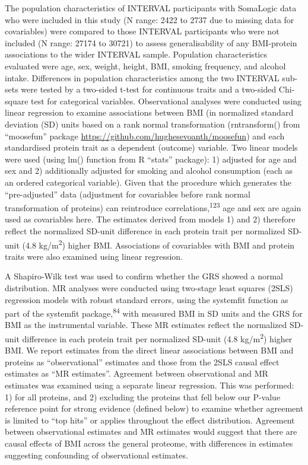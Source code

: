 \documentclass[11pt,twoside]{bristolthesis}
\begin{document}
The population characteristics of INTERVAL participants with SomaLogic data who were included in this study (N range: 2422 to 2737 due to missing data for covariables) were compared to those INTERVAL participants who were not included (N range: 27174 to 30721) to assess generalisability of any BMI-protein associations to the wider INTERVAL sample. Population characteristics evaluated were age, sex, weight, height, BMI, smoking frequency, and alcohol intake. Differences in population characteristics among the two INTERVAL sub-sets were tested by a two-sided t-test for continuous traits and a two-sided Chi-square test for categorical variables. Observational analyses were conducted using linear regression to examine associations between BMI (in normalized standard deviation (SD) units based on a rank normal transformation (rntransform() from ``moosefun'' package \url{https://github.com/hughesevoanth/moosefun}) and each standardised protein trait as a dependent (outcome) variable. Two linear models were used (using lm() function from R ``stats'' package): 1) adjusted for age and sex and 2) additionally adjusted for smoking and alcohol consumption (each as an ordered categorical variable). Given that the procedure which generates the ``pre-adjusted'' data (adjustment for covariables before rank normal transformation of proteins) can reintroduce correlations,\textsuperscript{123} age and sex are again used as covariables here. The estimates derived from models 1) and 2) therefore reflect the normalized SD-unit difference in each protein trait per normalized SD-unit (4.8 kg/m\textsuperscript{2}) higher BMI. Associations of covariables with BMI and protein traits were also examined using linear regression.

A Shapiro-Wilk test was used to confirm whether the GRS showed a normal distribution. MR analyses were conducted using two-stage least squares (2SLS) regression models with robust standard errors, using the systemfit function as part of the systemfit package,\textsuperscript{84} with measured BMI in SD units and the GRS for BMI as the instrumental variable. These MR estimates reflect the normalized SD-unit difference in each protein trait per normalized SD-unit (4.8 kg/m\textsuperscript{2}) higher BMI. We report estimates from the direct linear associations between BMI and proteins as ``observational'' estimates and those from the 2SLS causal effect estimates as ``MR estimates''. Agreement between observational and MR estimates was examined using a separate linear regression. This was performed: 1) for all proteins, and 2) excluding the proteins that fell below our P-value reference point for strong evidence (defined below) to examine whether agreement is limited to ``top hits'' or applies throughout the effect distribution. Agreement between observational estimates and MR estimates would suggest that there are causal effects of BMI across the general proteome, with differences in estimates suggesting confounding of observational estimates.
\end{document}
